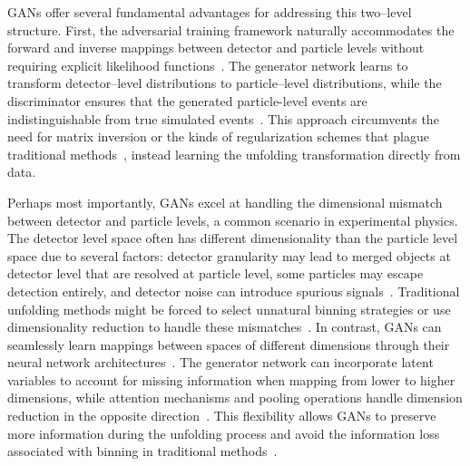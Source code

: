                 GANs offer several fundamental advantages for addressing this two--level structure.
                First, the adversarial training framework naturally accommodates the forward and inverse mappings between detector and particle levels without requiring explicit likelihood functions~\cite{datta_unfolding_2018, hashemi_deep_2024, bellagente_how_2020}.
                The generator network learns to transform detector--level distributions to particle--level distributions, while the discriminator ensures that the generated particle-level events are indistinguishable from true simulated events~\cite{erdmann_generating_2018}.
                This approach circumvents the need for matrix inversion or the kinds of regularization schemes that plague traditional methods~\cite{Girosi1995RegularizationArchitectures, Santos2022AvoidingNetworks}, instead learning the unfolding transformation directly from data.
                
                Perhaps most importantly, GANs excel at handling the dimensional mismatch between detector and particle levels, a common scenario in experimental physics.
                The detector level space often has different dimensionality than the particle level space due to several factors: detector granularity may lead to merged objects at detector level that are resolved at particle level, some particles may escape detection entirely, and detector noise can introduce spurious signals~\cite{komiske_preserving_2021, andreassen_omnifold_2020}.
                Traditional unfolding methods might be forced to select unnatural binning strategies or use dimensionality reduction to handle these mismatches~\cite{schmitt_tunfold_2012}.
                In contrast, GANs can seamlessly learn mappings between spaces of different dimensions through their neural network architectures~\cite{bellagente_how_2020}.
                The generator network can incorporate latent variables to account for missing information when mapping from lower to higher dimensions, while attention mechanisms and pooling operations handle dimension reduction in the opposite direction~\cite{datta_unfolding_2018,Erdmann_2019}. This flexibility allows GANs to preserve more information during the unfolding process and avoid the information loss associated with binning in traditional methods~\cite{andreassen_omnifold_2020}.
        

